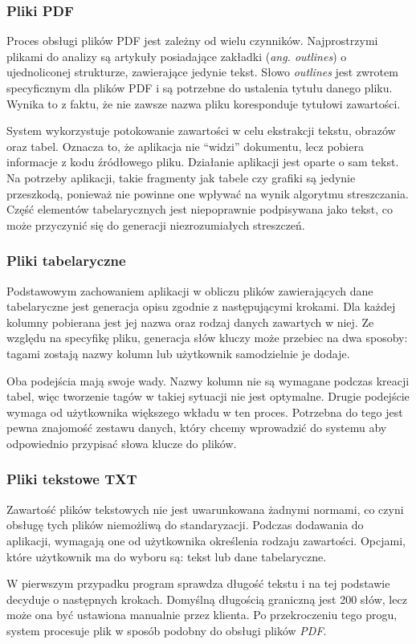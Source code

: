 \documentclass[12pt,a4paper,twoside]{article}
\begin{document}
\subsubsection*{Pliki PDF}
Proces obsługi plików PDF jest zależny od wielu czynników. Najprostrzymi plikami do analizy są artykuły posiadające zakładki (\textit{ang. outlines}) o ujednoliconej strukturze, zawierające jedynie tekst. Słowo \textit{outlines} jest zwrotem specyficznym dla plików PDF i są potrzebne do ustalenia tytułu danego pliku. Wynika to z faktu, że nie zawsze nazwa pliku koresponduje tytułowi zawartości.\par
System wykorzystuje potokowanie zawartości w celu ekstrakcji tekstu, obrazów oraz tabel. Oznacza to, że aplikacja nie ``widzi'' dokumentu, lecz pobiera informacje z kodu źródłowego pliku. Działanie aplikacji jest oparte o sam tekst. Na potrzeby aplikacji, takie fragmenty jak tabele czy grafiki są jedynie przeszkodą, ponieważ nie powinne one wpływać na wynik algorytmu streszczania. Część elementów tabelarycznych jest niepoprawnie podpisywana jako tekst, co może przyczynić się do generacji niezrozumiałych streszczeń. 
\subsubsection*{Pliki tabelaryczne}
Podstawowym zachowaniem aplikacji w obliczu plików zawierających dane tabelaryczne jest generacja opisu zgodnie z następującymi krokami. Dla każdej kolumny pobierana jest jej nazwa oraz rodzaj danych zawartych w niej. Ze względu na specyfikę pliku, generacja słów kluczy może przebiec na dwa sposoby: tagami zostają nazwy kolumn lub użytkownik samodzielnie je dodaje.\par
Oba podejścia mają swoje wady. Nazwy kolumn nie są wymagane podczas kreacji tabel, więc tworzenie tagów w takiej sytuacji nie jest optymalne. Drugie podejście wymaga od użytkownika większego wkładu w ten proces. Potrzebna do tego jest pewna znajomość zestawu danych, który chcemy wprowadzić do systemu aby odpowiednio przypisać słowa klucze do plików.
\subsubsection*{Pliki tekstowe TXT}
Zawartość plików tekstowych nie jest uwarunkowana żadnymi normami, co czyni obsługę tych plików niemożliwą do standaryzacji. Podczas dodawania do aplikacji, wymagają one od użytkownika określenia rodzaju zawartości. Opcjami, które użytkownik ma do wyboru są: tekst lub dane tabelaryczne.\par
W pierwszym przypadku program sprawdza długość tekstu i na tej podstawie decyduje o następnych krokach. Domyślną długością graniczną jest 200 słów, lecz może ona być ustawiona manualnie przez klienta. Po przekroczeniu tego progu, system procesuje plik w sposób podobny do obsługi plików \textit{PDF}.\par
\end{document}
